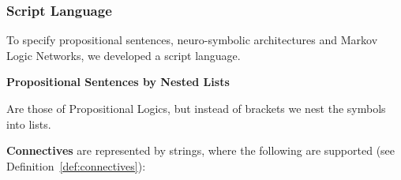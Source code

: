 \subsubsection{Script Language}\label{subsec:scriptLanguage} %

To specify propositional sentences, neuro-symbolic architectures and Markov Logic Networks, we developed a script language.

\textbf{Propositional Sentences by Nested Lists}

Are those of Propositional Logics, but instead of brackets we nest the symbols into lists.

\textbf{Connectives} are represented by strings, where the following are supported (see Definition~\ref{def:connectives}):
\begin{center}
\end{center}

